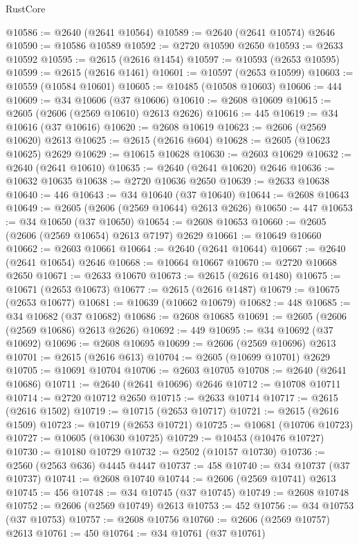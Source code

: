 \begin{lexlean}{RustCore}
\begin{coremodule}
@10586 := @2640 (@2641 @10564)
@10589 := @2640 (@2641 @10574) @2646
@10590 := @10586 @10589
@10592 := @2720 @10590 @2650
@10593 := @2633 @10592
@10595 := @2615 (@2616 @1454)
@10597 := @10593 (@2653 @10595)
@10599 := @2615 (@2616 @1461)
@10601 := @10597 (@2653 @10599)
@10603 := @10559 (@10584 @10601)
@10605 := @10485 (@10508 @10603)
@10606 := 444
@10609 := @34 @10606 (@37 @10606)
@10610 := @2608 @10609
@10615 := @2605 (@2606 (@2569 @10610) @2613 @2626)
@10616 := 445
@10619 := @34 @10616 (@37 @10616)
@10620 := @2608 @10619
@10623 := @2606 (@2569 @10620) @2613
@10625 := @2615 (@2616 @604)
@10628 := @2605 (@10623 @10625) @2629
@10629 := @10615 @10628
@10630 := @2603 @10629
@10632 := @2640 (@2641 @10610)
@10635 := @2640 (@2641 @10620) @2646
@10636 := @10632 @10635
@10638 := @2720 @10636 @2650
@10639 := @2633 @10638
@10640 := 446
@10643 := @34 @10640 (@37 @10640)
@10644 := @2608 @10643
@10649 := @2605 (@2606 (@2569 @10644) @2613 @2626)
@10650 := 447
@10653 := @34 @10650 (@37 @10650)
@10654 := @2608 @10653
@10660 := @2605 (@2606 (@2569 @10654) @2613 @7197) @2629
@10661 := @10649 @10660
@10662 := @2603 @10661
@10664 := @2640 (@2641 @10644)
@10667 := @2640 (@2641 @10654) @2646
@10668 := @10664 @10667
@10670 := @2720 @10668 @2650
@10671 := @2633 @10670
@10673 := @2615 (@2616 @1480)
@10675 := @10671 (@2653 @10673)
@10677 := @2615 (@2616 @1487)
@10679 := @10675 (@2653 @10677)
@10681 := @10639 (@10662 @10679)
@10682 := 448
@10685 := @34 @10682 (@37 @10682)
@10686 := @2608 @10685
@10691 := @2605 (@2606 (@2569 @10686) @2613 @2626)
@10692 := 449
@10695 := @34 @10692 (@37 @10692)
@10696 := @2608 @10695
@10699 := @2606 (@2569 @10696) @2613
@10701 := @2615 (@2616 @613)
@10704 := @2605 (@10699 @10701) @2629
@10705 := @10691 @10704
@10706 := @2603 @10705
@10708 := @2640 (@2641 @10686)
@10711 := @2640 (@2641 @10696) @2646
@10712 := @10708 @10711
@10714 := @2720 @10712 @2650
@10715 := @2633 @10714
@10717 := @2615 (@2616 @1502)
@10719 := @10715 (@2653 @10717)
@10721 := @2615 (@2616 @1509)
@10723 := @10719 (@2653 @10721)
@10725 := @10681 (@10706 @10723)
@10727 := @10605 (@10630 @10725)
@10729 := @10453 (@10476 @10727)
@10730 := @10180 @10729
@10732 := @2502 (@10157 @10730)
@10736 := @2560 (@2563 @636) @4445 @4447
@10737 := 458
@10740 := @34 @10737 (@37 @10737)
@10741 := @2608 @10740
@10744 := @2606 (@2569 @10741) @2613
@10745 := 456
@10748 := @34 @10745 (@37 @10745)
@10749 := @2608 @10748
@10752 := @2606 (@2569 @10749) @2613
@10753 := 452
@10756 := @34 @10753 (@37 @10753)
@10757 := @2608 @10756
@10760 := @2606 (@2569 @10757) @2613
@10761 := 450
@10764 := @34 @10761 (@37 @10761)

\end{coremodule}
\end{lexlean}
